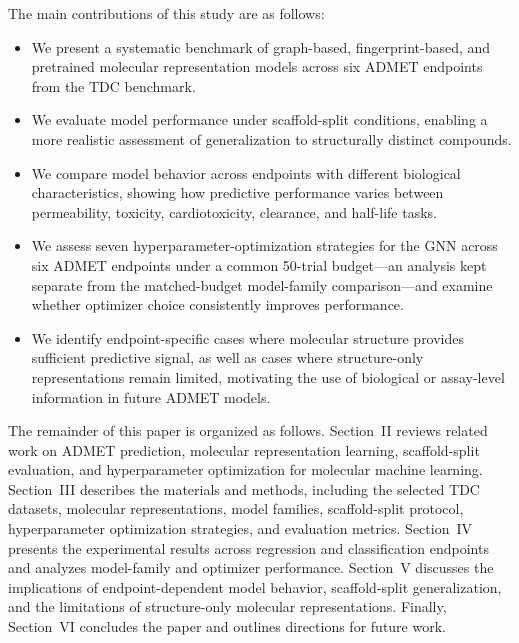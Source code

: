 \documentclass[journal]{IEEEtran}
\begin{document}
The main contributions of this study are as follows:

\begin{itemize}
    \item We present a systematic benchmark of graph-based, fingerprint-based, and pretrained molecular representation models across six ADMET endpoints from the TDC benchmark.

    \item We evaluate model performance under scaffold-split conditions, enabling a more realistic assessment of generalization to structurally distinct compounds.

    \item We compare model behavior across endpoints with different biological characteristics, showing how predictive performance varies between permeability, toxicity, cardiotoxicity, clearance, and half-life tasks.

    \item We assess seven hyperparameter-optimization strategies for the GNN across six ADMET endpoints under a common 50-trial budget---an analysis kept separate from the matched-budget model-family comparison---and examine whether optimizer choice consistently improves performance.

    \item We identify endpoint-specific cases where molecular structure provides sufficient predictive signal, as well as cases where structure-only representations remain limited, motivating the use of biological or assay-level information in future ADMET models.
\end{itemize}

The remainder of this paper is organized as follows.
Section~II reviews related work on ADMET prediction, molecular representation learning, scaffold-split evaluation, and hyperparameter optimization for molecular machine learning.
Section~III describes the materials and methods, including the selected TDC datasets, molecular representations, model families, scaffold-split protocol, hyperparameter optimization strategies, and evaluation metrics.
Section~IV presents the experimental results across regression and classification endpoints and analyzes model-family and optimizer performance.
Section~V discusses the implications of endpoint-dependent model behavior, scaffold-split generalization, and the limitations of structure-only molecular representations.
Finally, Section~VI concludes the paper and outlines directions for future work.
\end{document}
